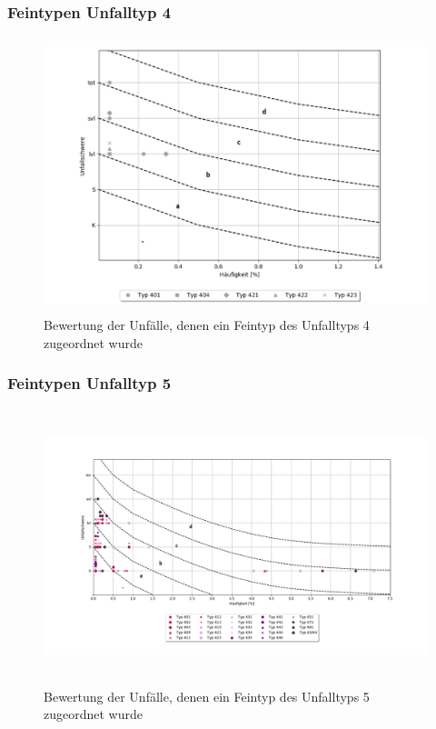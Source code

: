 \subsubsection{Feintypen Unfalltyp 4}


\begin{savenotes}
	\begin{figure}[H]
		\centering
		\includegraphics[width=12cm,height=8cm]{figures/Bewertung_FT4}
		\caption[Bewertung der Unfälle, denen ein Feintyp des Unfalltyps 4 zugeordnet wurde]{Bewertung der Unfälle, denen ein Feintyp des Unfalltyps 4 zugeordnet wurde}\label{fig:Bewertung_FT4}
	\end{figure}
\end{savenotes}

\subsubsection{Feintypen Unfalltyp 5}


\begin{savenotes}
	\begin{figure}[H]
		\centering
		\includegraphics[width=12cm,height=8cm]{figures/Bewertung_FT5}
		\caption[Bewertung der Unfälle, denen ein Feintyp des Unfalltyps 5 zugeordnet wurde]{Bewertung der Unfälle, denen ein Feintyp des Unfalltyps 5 zugeordnet wurde}\label{fig:Bewertung_FT5}
	\end{figure}
\end{savenotes}

